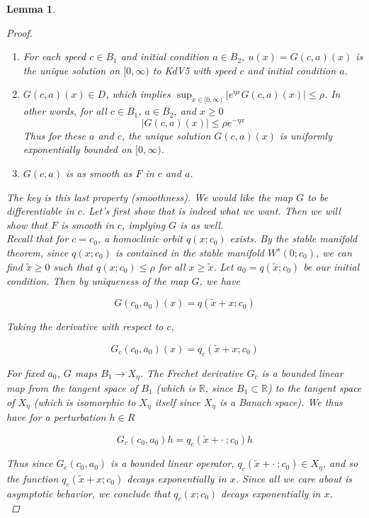 \documentclass[12pt]{article}
\def\R{{\mathbb R}}
\newtheorem{lemma}{Lemma}
\begin{document}
\begin{lemma}
\begin{proof}
\begin{enumerate}
	\item For each speed $c \in B_1$ and initial condition $a \in B_2$, $u(x) = G(c, a)(x)$ is the unique solution on $[0, \infty)$ to KdV5 with speed $c$ and initial condition $a$.

	\item $G(c, a)(x) \in D$, which implies $\sup_{x \in [0, \infty)} |e^{\eta x} G(c, a)(x)| \leq \rho$. In other words, for all $c \in B_1$, $a \in B_2$, and $x \geq 0$
	\begin{equation}
		|G(c, a)(x)| \leq \rho e^{-\eta x}
	\end{equation}
	Thus for these $a$ and $c$, the unique solution $G(c, a)(x)$ is uniformly exponentially bounded on $[0, \infty)$.

	\item $G(c, a)$ is as smooth as $F$ in $c$ and $a$.
\end{enumerate}

The key is this last property (smoothness). We would like the map $G$ to be differentiable in $c$. Let's first show that is indeed what we want. Then we will show that $F$ is smooth in $c$, implying $G$ is as well.\\

Recall that for $c = c_0$, a homoclinic orbit $q(x; c_0)$ exists. By the stable manifold theorem, since $q(x; c_0)$ is contained in the stable manifold $W^s(0; c_0)$, we can find $\tilde{x} \geq 0$ such that $q(x; c_0) \leq \rho$ for all $x \geq \tilde{x}$. Let $a_0 = q(\tilde{x}; c_0)$ be our initial condition. Then by uniqueness of the map $G$, we have 

\[
G(c_0, a_0)(x) = q(\tilde{x} + x; c_0)
\]

Taking the derivative with respect to $c$,

\[
G_c(c_0, a_0)(x) = q_c(\tilde{x} + x; c_0)
\]

For fixed $a_0$, $G$ maps $B_1 \rightarrow X_\eta$. The Frechet derivative $G_c$ is a bounded linear map from the tangent space of $B_1$ (which is $\R$, since $B_1 \subset \R$) to the tangent space of $X_\eta$ (which is isomorphic to $X_\eta$ itself since $X_\eta$ is a Banach space). We thus have for a perturbation $h \in R$

\[
G_c(c_0, a_0)h = q_c(\tilde{x} + \cdot \: ; c_0) h
\]

Thus since $G_c(c_0, a_0)$ is a bounded linear operator, $q_c(\tilde{x} + \cdot \: ; c_0) \in X_\eta$, and so the function $q_c(\tilde{x} + x ; c_0)$ decays exponentially in $x$. Since all we care about is asymptotic behavior, we conclude that $q_c(x ; c_0)$ decays exponentially in $x$.\\


\end{proof}
\end{lemma}
\end{document}
